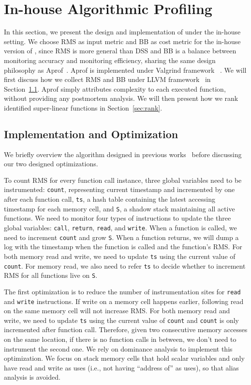 \section{In-house Algorithmic Profiling}
\label{sec:in-house}

In this section, we present the design and implementation 
of \Tool under the in-house setting. 
We choose RMS as input metric and BB as cost 
metric for the in-house version of \Tool, 
since RMS is more general than DSS and BB is a balance 
between monitoring accuracy and monitoring efficiency, 
sharing the same design philosophy as Aprof~\cite{Aprof1,Aprof2}.
Aprof is implemented under Valgrind framework~\cite{valgrind} .
We will first discuss how we collect RMS and BB under LLVM 
framework~\cite{llvm} in Section~\ref{sec:inhouse_impl}.
Aprof simply attributes complexity to each executed function, 
without providing any postmortem analysis. 
We will then present how we rank identified super-linear 
functions in Section~\ref{sec:rank}. 


\subsection{Implementation and Optimization}
\label{sec:inhouse_impl}

We briefly overview the algorithm 
designed in previous works~\cite{Aprof1,Aprof2} 
before discussing our two designed optimizations. 

To count RMS for every function call instance, 
three global variables need to be instrumented:
\texttt{count}, representing current timestamp 
and incremented by one after each function call,
\texttt{ts}, a hash table containing the latest accessing timestamp 
for each memory cell,
and \texttt{S}, a shadow stack maintaining all active functions. 
We need to monitor four types of instructions to 
update the three global variables:
\texttt{call}, \texttt{return}, \texttt{read}, and \texttt{write}.
When a function is called, 
we need to increment \texttt{count} and grow \texttt{S}.
When a function returns, 
we will dump a log with the timestamp 
when the function is called and the function's RMS.
For both memory read and write, we 
need to update \texttt{ts} 
using the current value of \texttt{count}. 
For memory read, we also need to refer \texttt{ts} to decide 
whether to increment RMS for 
all functions live on \texttt{S}.

The first optimization is to reduce the number of 
instrumentation sites for \texttt{read} and \texttt{write} instructions. 
If write on a memory cell happens earlier, 
following read on the same memory cell will not increase RMS.
For both memory read and write, 
we need to update \texttt{ts} using the current 
value of \texttt{count} and \texttt{count} is only incremented after function call. 
Therefore, given two consecutive memory accesses on the same location,
if there is no function calls in between, 
we don't need to instrument the second one. 
We rely on dominance analysis to implement this optimization. 
We focus on stack memory cells that hold scalar variables 
and only have read and write as uses 
(i.e., not having ``address of'' as uses), 
so that alias analysis is avoided. 

